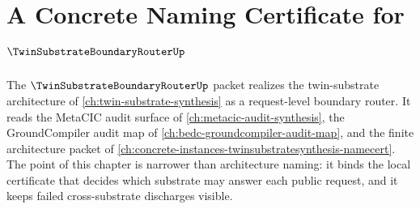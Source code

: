 \chapter{A Concrete Naming Certificate for $\TwinSubstrateBoundaryRouterUp$}
\label{ch:concrete-instances-twin-substrate-boundary-router-namecert}

The $\TwinSubstrateBoundaryRouterUp$ packet realizes the twin-substrate architecture of \autoref{ch:twin-substrate-synthesis} as a request-level boundary router. It reads the MetaCIC audit surface of \autoref{ch:metacic-audit-synthesis}, the GroundCompiler audit map of \autoref{ch:bedc-groundcompiler-audit-map}, and the finite architecture packet of \autoref{ch:concrete-instances-twinsubstratesynthesis-namecert}. The point of this chapter is narrower than architecture naming: it binds the local certificate that decides which substrate may answer each public request, and it keeps failed cross-substrate discharges visible.

